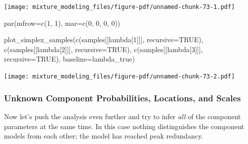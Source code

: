 \documentclass[
  letterpaper,
  DIV=11,
  numbers=noendperiod]{scrartcl}
\newenvironment{Shaded}{\begin{snugshade}}{\end{snugshade}}
\newcommand{\AttributeTok}[1]{\textcolor[rgb]{0.40,0.45,0.13}{#1}}
\newcommand{\ConstantTok}[1]{\textcolor[rgb]{0.56,0.35,0.01}{#1}}
\newcommand{\DecValTok}[1]{\textcolor[rgb]{0.68,0.00,0.00}{#1}}
\newcommand{\FunctionTok}[1]{\textcolor[rgb]{0.28,0.35,0.67}{#1}}
\newcommand{\NormalTok}[1]{\textcolor[rgb]{0.00,0.23,0.31}{#1}}
\newcommand{\StringTok}[1]{\textcolor[rgb]{0.13,0.47,0.30}{#1}}
\begin{document}
\texttt{[image: mixture\_modeling\_files/figure-pdf/unnamed-chunk-73-1.pdf]}

\begin{Shaded}
\begin{Highlighting}[]
\FunctionTok{par}\NormalTok{(}\AttributeTok{mfrow=}\FunctionTok{c}\NormalTok{(}\DecValTok{1}\NormalTok{, }\DecValTok{1}\NormalTok{), }\AttributeTok{mar=}\FunctionTok{c}\NormalTok{(}\DecValTok{0}\NormalTok{, }\DecValTok{0}\NormalTok{, }\DecValTok{0}\NormalTok{, }\DecValTok{0}\NormalTok{))}

\FunctionTok{plot\_simplex\_samples}\NormalTok{(}\FunctionTok{c}\NormalTok{(samples[[}\StringTok{\textquotesingle{}lambda[1]\textquotesingle{}}\NormalTok{]], }\AttributeTok{recursive=}\ConstantTok{TRUE}\NormalTok{),}
                     \FunctionTok{c}\NormalTok{(samples[[}\StringTok{\textquotesingle{}lambda[2]\textquotesingle{}}\NormalTok{]], }\AttributeTok{recursive=}\ConstantTok{TRUE}\NormalTok{),}
                     \FunctionTok{c}\NormalTok{(samples[[}\StringTok{\textquotesingle{}lambda[3]\textquotesingle{}}\NormalTok{]], }\AttributeTok{recursive=}\ConstantTok{TRUE}\NormalTok{),}
                     \AttributeTok{baseline=}\NormalTok{lambda\_true)}
\end{Highlighting}
\end{Shaded}

\texttt{[image: mixture\_modeling\_files/figure-pdf/unnamed-chunk-73-2.pdf]}

\subsubsection{Unknown Component Probabilities, Locations, and
Scales}\label{unknown-component-probabilities-locations-and-scales}

Now let's push the analysis even further and try to infer \emph{all} of
the component parameters at the same time. In this case nothing
distinguishes the component models from each other; the model has
reached peak redundancy.
\end{document}
